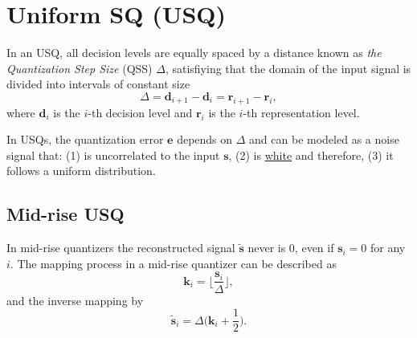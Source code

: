 
\section{Uniform SQ (USQ)}

In an USQ, all decision levels are equally spaced by a distance known
as \emph{the Quantization Step Size} (QSS) $\Delta$, satisfiying that
the domain of the input signal is divided into intervals of constant
size
\begin{equation}
  \Delta={\mathbf d}_{i+1}-{\mathbf d}_i={\mathbf r}_{i+1}-{\mathbf r}_i,
\end{equation}
where ${\mathbf d}_i$ is the $i$-th decision level and ${\mathbf r}_i$
is the $i$-th representation level.

In USQs, the quantization error ${\mathbf e}$ depends on $\Delta$ and
can be modeled as a noise signal that: (1) is uncorrelated to the
input ${\mathbf s}$, (2) is
\href{https://en.wikipedia.org/wiki/White_noise}{white} and therefore,
(3) it follows a uniform distribution.




\subsection{Mid-rise USQ}

In mid-rise quantizers the reconstructed signal $\tilde{\mathbf s}$
never is 0, even if ${\mathbf s}_i=0$ for any $i$. The mapping process
in a mid-rise quantizer can be described as
\begin{equation}
  {\mathbf k}_i = \Big\lfloor \frac{{\mathbf s}_i}{\Delta} \Big\rfloor,
  \label{eq:mid-rise}
\end{equation}
and the inverse mapping by
\begin{equation}
  \tilde{\mathbf s}_i = \Delta\Big({\mathbf k}_i + \frac{1}{2}\Big).
  \label{eq:inverse_mid-rise}
\end{equation}


